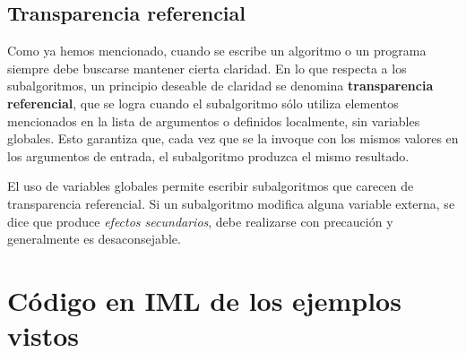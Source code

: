 \documentclass[]{book}
\begin{document}
\hypertarget{transparencia-referencial}{%
\subsection{Transparencia referencial}\label{transparencia-referencial}}

Como ya hemos mencionado, cuando se escribe un algoritmo o un programa siempre debe buscarse mantener cierta claridad. En lo que respecta a los subalgoritmos, un principio deseable de claridad se denomina \textbf{transparencia referencial}, que se logra cuando el subalgoritmo sólo utiliza elementos mencionados en la lista de argumentos o definidos localmente, sin variables globales. Esto garantiza que, cada vez que se la invoque con los mismos valores en los argumentos de entrada, el subalgoritmo produzca el mismo resultado.

El uso de variables globales permite escribir subalgoritmos que carecen de transparencia referencial. Si un subalgoritmo modifica alguna variable externa, se dice que produce \emph{efectos secundarios}, debe realizarse con precaución y generalmente es desaconsejable.

\hypertarget{codigo-en-iml-de-los-ejemplos-vistos}{%
\section{Código en IML de los ejemplos vistos}\label{codigo-en-iml-de-los-ejemplos-vistos}}
\end{document}
